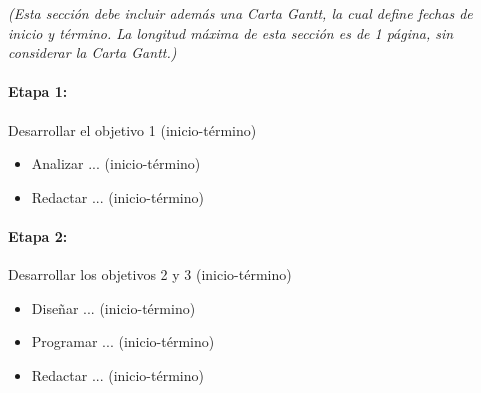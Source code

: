 \documentclass[11pt,letterpaper]{article}
\begin{document}
\emph{(Esta sección debe incluir además una Carta Gantt, la cual define fechas de inicio y término. La longitud máxima de esta sección es de 1 página, sin considerar la Carta Gantt.)}

\paragraph{Etapa 1:} Desarrollar el objetivo 1 (inicio-término)
\begin{itemize}
\item Analizar ... (inicio-término)
\item Redactar ... (inicio-término)
\end{itemize}

\paragraph{Etapa 2:} Desarrollar los objetivos 2 y 3 (inicio-término)
\begin{itemize}
\item Diseñar ... (inicio-término)
\item Programar ... (inicio-término)
\item Redactar ... (inicio-término)
\end{itemize}





\end{document}
